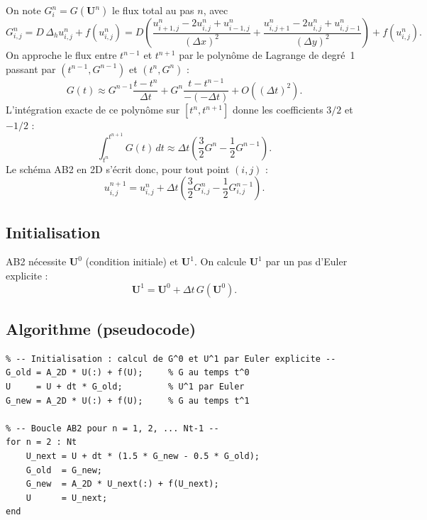 \documentclass[11pt,a4paper]{report}
\begin{document}
On note $G_i^n = G(\mathbf{U}^n)$ le flux total au pas $n$, avec
\begin{equation}
  G_{i,j}^n = D\,\Delta_h u_{i,j}^n + f(u_{i,j}^n)
  = D\!\left(\frac{u_{i+1,j}^n-2u_{i,j}^n+u_{i-1,j}^n}{(\Delta x)^2}
            +\frac{u_{i,j+1}^n-2u_{i,j}^n+u_{i,j-1}^n}{(\Delta y)^2}\right)
  + f(u_{i,j}^n).
\end{equation}
On approche le flux entre $t^{n-1}$ et $t^{n+1}$ par le polyn\^ome de Lagrange de
degr\'e~1 passant par $(t^{n-1},G^{n-1})$ et $(t^n,G^n)$ :
\begin{equation}
  G(t) \approx G^{n-1}\frac{t-t^n}{\Delta t}
             + G^n\frac{t-t^{n-1}}{-(-\Delta t)}
             + O((\Delta t)^2).
\end{equation}
L'int\'egration exacte de ce polyn\^ome sur $[t^n,t^{n+1}]$ donne les coefficients
$3/2$ et $-1/2$ :
\begin{equation}
  \int_{t^n}^{t^{n+1}} G(t)\,dt \approx \Delta t\!\left(\frac{3}{2}G^n - \frac{1}{2}G^{n-1}\right).
\end{equation}
Le sch\'ema AB2 en 2D s'\'ecrit donc, pour tout point $(i,j)$ :
\begin{equation}
  \boxed{u_{i,j}^{n+1} = u_{i,j}^n
    + \Delta t\!\left(\frac{3}{2}G_{i,j}^n - \frac{1}{2}G_{i,j}^{n-1}\right).}
\end{equation}

\subsection*{Initialisation}

AB2 n\'ecessite $\mathbf{U}^0$ (condition initiale) et $\mathbf{U}^1$. On calcule
$\mathbf{U}^1$ par un pas d'Euler explicite :
\begin{equation}
  \mathbf{U}^1 = \mathbf{U}^0 + \Delta t\,G(\mathbf{U}^0).
\end{equation}

\subsection*{Algorithme (pseudocode)}

\begin{lstlisting}
% -- Initialisation : calcul de G^0 et U^1 par Euler explicite --
G_old = A_2D * U(:) + f(U);     % G au temps t^0
U     = U + dt * G_old;         % U^1 par Euler
G_new = A_2D * U(:) + f(U);     % G au temps t^1

% -- Boucle AB2 pour n = 1, 2, ... Nt-1 --
for n = 2 : Nt
    U_next = U + dt * (1.5 * G_new - 0.5 * G_old);
    G_old  = G_new;
    G_new  = A_2D * U_next(:) + f(U_next);
    U      = U_next;
end
\end{lstlisting}
\end{document}
